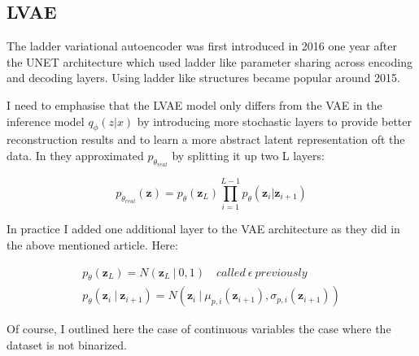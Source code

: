 \documentclass[12pt, english]{article}
\begin{document}
\subsection{LVAE}

\vspace{5mm}

\par The ladder variational autoencoder was first introduced in 2016 \cite{sonderby2016ladder} one year after the UNET \cite{ronneberger2015u} architecture which used ladder like parameter sharing across encoding and decoding layers. Using ladder like structures became popular around 2015.

\vspace{4mm}

\par I need to emphasise that the LVAE model only differs from the VAE in the inference model $q_{\phi} (z | x)$ by introducing more stochastic layers to provide better reconstruction results and to learn a more abstract latent representation oft the data. In \cite{sonderby2016ladder} they approximated $p_{\theta_{real}}$ by splitting it up two L layers:

\vspace{4mm}

\begin{equation}
    p_{\theta_{real}}(\bm{z}) =  p_{\theta}(\bm{z}_{L})\prod_{i = 1}^{L - 1}p_{\theta}(\bm{z}_i | \bm{z}_{i+1})
\end{equation}

\vspace{4mm}

\par In practice I added one additional layer to the VAE architecture as they did in the above mentioned article. Here:

\vspace{4mm}

\begin{gather*}
    p_{\theta}(\bm{z}_L) = N(\bm{z}_L  ~ | ~ 0, 1) \quad called\ \epsilon\ previously\\
    p_{\theta}(\bm{z}_i ~ | ~ \bm{z}_{i+1}) = N(\bm{z}_i ~ |  ~ \mu_{p,i}(\bm{z}_{i+1}), \sigma_{p, i}(\bm{z}_{i+1}))
\end{gather*}

\vspace{4mm}

\par Of course, I outlined here the case of continuous variables the case where the dataset is not binarized. 
\end{document}
